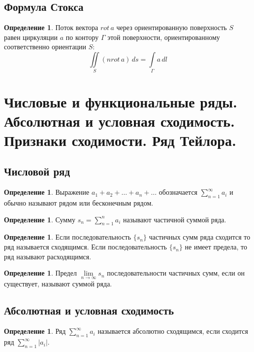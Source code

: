 \documentclass[12pt]{report}
\theoremstyle{definition}
\newtheorem{definition}[theorem]{Определение}
\begin{document}
\subsection{Формула Стокса}
\begin{definition}
Поток вектора $rot\, a$ через ориентированную поверхность $S$ равен
циркуляции $a$ по контору $\Gamma$ этой поверхности, ориентированному
соответственно ориентации $S$:
$$
\iint\limits_{S} (n rot \, a) \, ds = \int\limits_{\Gamma} a \, dl
$$
\end{definition}


\section
{
  Числовые и функциональные ряды.
  Абсолютная и условная сходимость.
  Признаки сходимости.
  Ряд Тейлора.
}

\subsection{Числовой ряд}
\begin{definition}
Выражение $a_1 + a_2 + \dots + a_n + \dots$ обозначается
$\sum\limits_{n=1}^\infty a_i$ и обычно называют рядом или
бесконечным рядом.
\end{definition}

\begin{definition}
Сумму $s_n = \sum\limits_{n=1}^n a_i$ называют частичной суммой ряда.
\end{definition}

\begin{definition}
Если последовательность $\{s_n\}$ частичных сумм ряда сходится то ряд
называется сходящимся. Если последовательность $\{s_n\}$ не имеет предела,
то ряд называют расходящимся.
\end{definition}

\begin{definition}
Предел $\lim\limits_{n \rightarrow \infty} s_n$ последовательности частичных
сумм, если он существует, называют суммой ряда.
\end{definition}

\subsection{Абсолютная и условная сходимость}
\begin{definition}
Ряд $\sum\limits_{n=1}^\infty a_i$ называется абсолютно
сходящимся, если сходится ряд $\sum\limits_{n=1}^\infty |a_i|$.
\end{definition}
\end{document}
